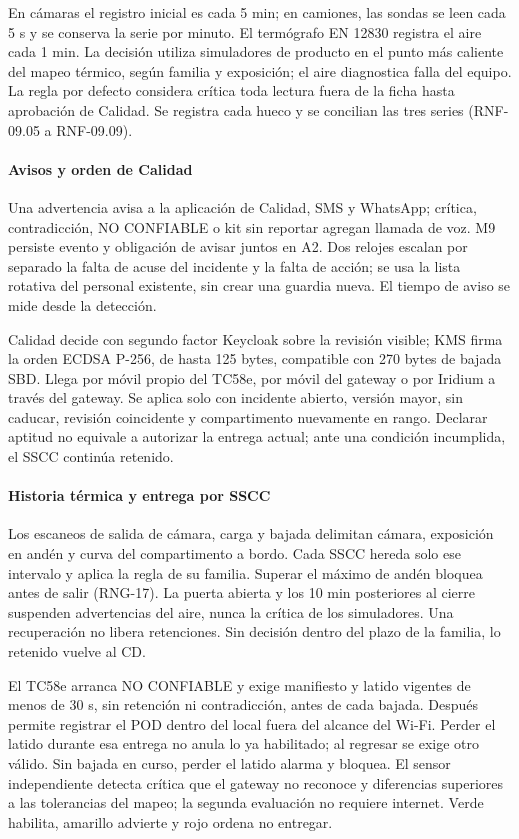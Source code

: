 En cámaras el registro inicial es cada 5 min; en camiones, las sondas se leen cada 5 s y se conserva la serie por minuto. El termógrafo EN 12830 registra el aire cada 1 min. La decisión utiliza simuladores de producto en el punto más caliente del mapeo térmico, según familia y exposición; el aire diagnostica falla del equipo. La regla por defecto considera crítica toda lectura fuera de la ficha hasta aprobación de Calidad. Se registra cada hueco y se concilian las tres series (RNF-09.05 a RNF-09.09).

\paragraph{Avisos y orden de Calidad}
Una advertencia avisa a la aplicación de Calidad, SMS y WhatsApp; crítica, contradicción, NO CONFIABLE o kit sin reportar agregan llamada de voz. M9 persiste evento y obligación de avisar juntos en A2. Dos relojes escalan por separado la falta de acuse del incidente y la falta de acción; se usa la lista rotativa del personal existente, sin crear una guardia nueva. El tiempo de aviso se mide desde la detección.

Calidad decide con segundo factor Keycloak sobre la revisión visible; KMS firma la orden ECDSA P-256, de hasta 125 bytes, compatible con 270 bytes de bajada SBD. Llega por móvil propio del TC58e, por móvil del gateway o por Iridium a través del gateway. Se aplica solo con incidente abierto, versión mayor, sin caducar, revisión coincidente y compartimento nuevamente en rango. Declarar aptitud no equivale a autorizar la entrega actual; ante una condición incumplida, el SSCC continúa retenido.

\paragraph{Historia térmica y entrega por SSCC}
Los escaneos de salida de cámara, carga y bajada delimitan cámara, exposición en andén y curva del compartimento a bordo. Cada SSCC hereda solo ese intervalo y aplica la regla de su familia. Superar el máximo de andén bloquea antes de salir (RNG-17). La puerta abierta y los 10 min posteriores al cierre suspenden advertencias del aire, nunca la crítica de los simuladores. Una recuperación no libera retenciones. Sin decisión dentro del plazo de la familia, lo retenido vuelve al CD.

El TC58e arranca NO CONFIABLE y exige manifiesto y latido vigentes de menos de 30 s, sin retención ni contradicción, antes de cada bajada. Después permite registrar el POD dentro del local fuera del alcance del Wi-Fi. Perder el latido durante esa entrega no anula lo ya habilitado; al regresar se exige otro válido. Sin bajada en curso, perder el latido alarma y bloquea. El sensor independiente detecta crítica que el gateway no reconoce y diferencias superiores a las tolerancias del mapeo; la segunda evaluación no requiere internet. Verde habilita, amarillo advierte y rojo ordena no entregar.

